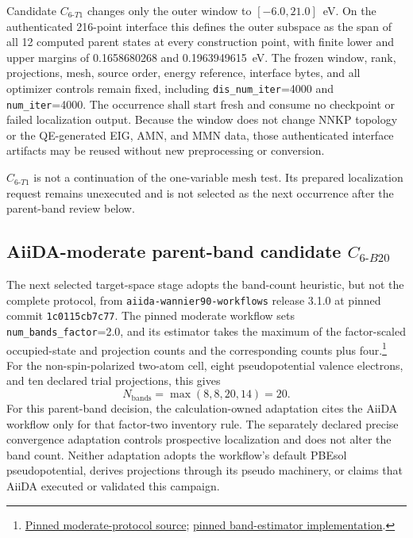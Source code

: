 \documentclass[11pt]{article}
\begin{document}
Candidate $C_{6\text{-}T1}$ changes only the outer window to
$[-6.0,21.0]$~eV.  On the authenticated 216-point interface this defines the outer
subspace as the span of all 12 computed parent states at every construction point, with
finite lower and upper margins of 0.1658680268 and 0.1963949615~eV.  The frozen window,
rank, projections, mesh, source order, energy reference, interface bytes, and all
optimizer controls remain fixed, including \texttt{dis\_num\_iter}=4000 and
\texttt{num\_iter}=4000.  The occurrence shall start fresh and consume no checkpoint or
failed localization output.  Because the window does not change NNKP topology or the
QE-generated EIG, AMN, and MMN data, those authenticated interface artifacts may be
reused without new preprocessing or conversion.

$C_{6\text{-}T1}$ is not a continuation of the one-variable mesh test.  Its prepared
localization request remains unexecuted and is not selected as the next occurrence after
the parent-band review below.

\subsection{AiiDA-moderate parent-band candidate
\texorpdfstring{$C_{6\text{-}B20}$}{C6-B20}}

The next selected target-space stage adopts the band-count heuristic, but not the
complete protocol, from \texttt{aiida-wannier90-workflows} release 3.1.0 at pinned
commit \texttt{1c0115cb7c77}.  The pinned moderate
workflow sets \texttt{num\_bands\_factor}=2.0, and its estimator takes the maximum of
the factor-scaled occupied-state and projection counts and the corresponding counts
plus four.\footnote{\href{https://github.com/aiidateam/aiida-wannier90-workflows/blob/1c0115cb7c77541a0bd549bc05005df435d651b6/src/aiida_wannier90_workflows/workflows/protocols/base/wannier90.yaml\#L6-L25}{Pinned moderate-protocol source};
\href{https://github.com/aiidateam/aiida-wannier90-workflows/blob/1c0115cb7c77541a0bd549bc05005df435d651b6/src/aiida_wannier90_workflows/utils/pseudo/__init__.py\#L292-L342}{pinned band-estimator implementation}.}
For the non-spin-polarized two-atom cell, eight pseudopotential valence electrons, and
ten declared trial projections, this gives
\begin{equation}
  N_{\mathrm{bands}}=\max(8,8,20,14)=20.
\end{equation}
For this parent-band decision, the calculation-owned adaptation cites the AiiDA
workflow only for that factor-two inventory rule.  The separately declared precise
convergence adaptation controls prospective localization and does not alter the band
count.  Neither adaptation adopts the workflow's default PBEsol pseudopotential,
derives projections through its pseudo machinery, or claims that AiiDA executed or
validated this campaign.
\end{document}

